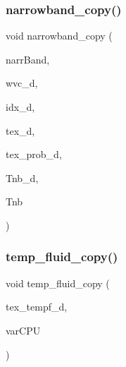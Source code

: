 \mbox{\label{memory__copy_8cu_aa8fddbe90f3f7212e8527b970c161fc7}} 
\subsubsection{\texorpdfstring{narrowband\+\_\+copy()}{narrowband\_copy()}}
{\footnotesize\ttfamily void narrowband\+\_\+copy (\begin{DoxyParamCaption}\item[{\hyperlink{classNarrowBand}{Narrow\+Band} $\ast$}]{narr\+Band,  }\item[{\hyperlink{param_8h_a5f097c9f3873af7be7fc156e6a06ca5e}{myfloat} $\ast$}]{wvc\+\_\+d,  }\item[{int $\ast$}]{idx\+\_\+d,  }\item[{cuda\+Texture\+Object\+\_\+t $\ast$}]{tex\+\_\+d,  }\item[{cuda\+Texture\+Object\+\_\+t $\ast$}]{tex\+\_\+prob\+\_\+d,  }\item[{\hyperlink{param_8h_a5f097c9f3873af7be7fc156e6a06ca5e}{myfloat} $\ast$}]{Tnb\+\_\+d,  }\item[{\hyperlink{param_8h_a5f097c9f3873af7be7fc156e6a06ca5e}{myfloat} $\ast$}]{Tnb }\end{DoxyParamCaption})}

\mbox{\label{memory__copy_8cu_ab8890b05006119c09b7bead311bea278}} 
\subsubsection{\texorpdfstring{temp\+\_\+fluid\+\_\+copy()}{temp\_fluid\_copy()}}
{\footnotesize\ttfamily void temp\+\_\+fluid\+\_\+copy (\begin{DoxyParamCaption}\item[{cuda\+Texture\+Object\+\_\+t $\ast$}]{tex\+\_\+tempf\+\_\+d,  }\item[{\hyperlink{classVar__CPU}{Var\+\_\+\+C\+PU} $\ast$}]{var\+C\+PU }\end{DoxyParamCaption})}



